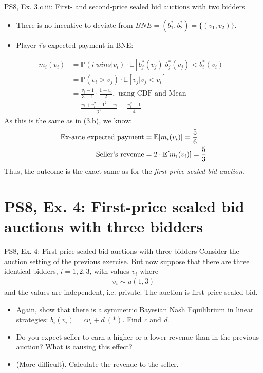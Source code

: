 \begin{frame}{PS8, Ex. 3.c.iii: First- and second-price sealed bid auctions with two bidders}
\begin{multicols}{2}
\begin{itemize}
        \item[(ii)] There is no incentive to deviate from $BNE=(b_1^*,b_2^*)=\{(v_1,v_2)\}$.
        \item[(iii)] Player \textit{i}'s expected payment in BNE:
      \end{itemize}
      \vspace{-12pt}
      \begin{align*}
        m_i(v_i)&=\mathbb{P}(i\ wins|v_i)\cdot\mathbb{E}[b_j^*(v_j)|b_j^*(v_j)<b_i^*(v_i)]\\
                &=\mathbb{P}(v_i>v_j)\cdot\mathbb{E}[v_j|v_j<v_i]\\
                &=\frac{v_i-1}{3-1}\cdot\frac{1+v_i}{2},\text{ using CDF and Mean}\\
                &=\frac{v_i+v_i^2-1^2-v_i}{2^2}=\frac{v_i^2-1}{4}
      \end{align*}
      As this is the same as in (3.b), we know:
      \vspace{-8pt}
      \begin{align*}\vspace{-4pt}
        \text{Ex-ante expected payment}&=\mathbb{E}[m_i(v_i)]=\frac{5}{6}\\
        \text{Seller's revenue}&=2\cdot\mathbb{E}[m_i(v_i)]=\frac{5}{3}
      \end{align*}
      Thus, the outcome is the exact same as for the \textit{first-price sealed bid auction}.
      \vfill\null
    \end{multicols}
\end{frame}



\section{PS8, Ex. 4: First-price sealed bid auctions with three bidders}

\begin{frame}{PS8, Ex. 4: First-price sealed bid auctions with three bidders}
    Consider the auction setting of the previous exercise. But now suppose that there are three identical bidders, $i = 1, 2, 3$, with values $v_i$ where
    \begin{align*}
      v_i\sim u(1, 3)
    \end{align*}
    and the values are independent, i.e. private. The auction is first-price sealed bid.
    \begin{itemize}
      \item[(a)] Again, show that there is a symmetric Bayesian Nash Equilibrium in linear strategies: $b_i(v_i) = cv_i + d\ (*)$. Find \textit{c} and \textit{d}.
      \item[(b)] Do you expect seller to earn a higher or a lower revenue than in the previous auction? What is causing this effect?
      \item[(c)] (More difficult). Calculate the revenue to the seller.
    \end{itemize}
    \vfill\null
\end{frame}


